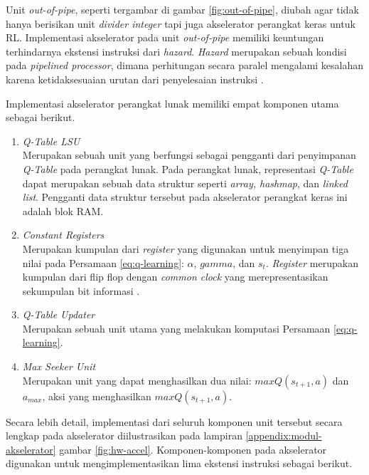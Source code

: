 Unit \textit{out-of-pipe}, seperti tergambar di gambar \ref{fig:out-of-pipe}, diubah agar tidak hanya berisikan unit \textit{divider integer} tapi juga akselerator perangkat keras untuk \ac{RL}. Implementasi akselerator pada unit \textit{out-of-pipe} memiliki keuntungan terhindarnya ekstensi instruksi dari \textit{hazard}. \textit{Hazard} merupakan sebuah kondisi pada \textit{pipelined processor}, dimana perhitungan secara paralel mengalami kesalahan karena ketidaksesuaian urutan dari penyelesaian instruksi \parencite{sarah2021digital}.

Implementasi akselerator perangkat lunak memiliki empat komponen utama sebagai berikut.

\begin{enumerate}
	\item \textit{Q-Table \ac{LSU}}\\
	      Merupakan sebuah unit yang berfungsi sebagai pengganti dari penyimpanan \textit{Q-Table} pada perangkat lunak. Pada perangkat lunak, representasi \textit{Q-Table} dapat merupakan sebuah data struktur seperti \textit{array, hashmap}, dan \textit{linked list}. Pengganti data struktur tersebut pada akselerator perangkat keras ini adalah blok \ac{RAM}.
	\item \textit{Constant Registers}\\
	      Merupakan kumpulan dari \textit{register} yang digunakan untuk menyimpan tiga nilai pada Persamaan \ref{eq:q-learning}: $\alpha$, $gamma$, dan $s_t$. \textit{Register} merupakan kumpulan dari flip flop dengan \textit{common clock} yang merepresentasikan sekumpulan bit informasi \parencite{sarah2021digital}.
	\item \textit{Q-Table Updater}\\
	      Merupakan sebuah unit utama yang melakukan komputasi Persamaan \ref{eq:q-learning}.
	\item \textit{Max Seeker Unit}\\
	      Merupakan unit yang dapat menghasilkan dua nilai: $maxQ(s_{t+1},a)$ dan $a_{max}$, aksi yang menghasilkan $maxQ(s_{t+1},a)$.
\end{enumerate}

Secara lebih detail, implementasi dari seluruh komponen unit tersebut secara lengkap pada akselerator diilustrasikan pada lampiran \ref{appendix:modul-akselerator} gambar \ref{fig:hw-accel}. Komponen-komponen pada akselerator digunakan untuk mengimplementasikan lima ekstensi instruksi sebagai berikut.

